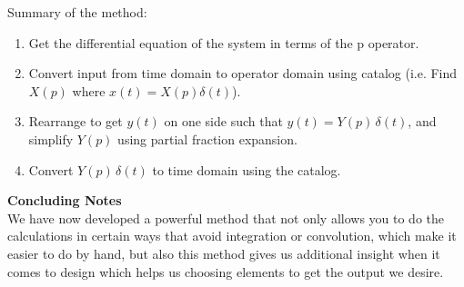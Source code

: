 \documentclass{report}
\begin{document}
Summary of the method:
\begin{enumerate}
    \item Get the differential equation of the system in terms of the p operator.
    \item Convert input from time domain to operator domain using catalog (i.e. Find $X(p)$ where $x(t) = X(p)\delta(t)$).
    \item Rearrange to get $y(t)$ on one side such that $y(t) = Y(p)\,\delta(t)$, and simplify $Y(p)$ using partial fraction expansion.
    \item Convert $Y(p)\,\delta(t)$ to time domain using the catalog.
\end{enumerate}

\textbf{Concluding Notes} \\
We have now developed a powerful method that not only allows you to do the calculations in certain ways that avoid integration or convolution, which make it easier to do by hand, but also this method gives us additional insight when it comes to design which helps us choosing elements to get the output we desire. 
\end{document}
